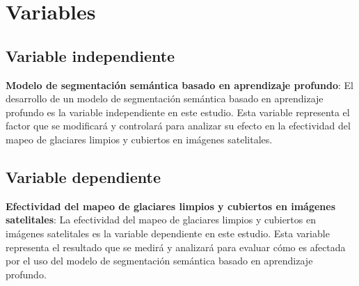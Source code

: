 \section{Variables}
\label{sec:Variables}

\subsection{Variable independiente}

\textbf{Modelo de segmentación semántica basado en aprendizaje profundo}: El desarrollo de un modelo de segmentación semántica basado en aprendizaje profundo es la variable independiente en este estudio. Esta variable representa el factor que se modificará y controlará para analizar su efecto en la efectividad del mapeo de glaciares limpios y cubiertos en imágenes satelitales.

\subsection{Variable dependiente}

\textbf{Efectividad del mapeo de glaciares limpios y cubiertos en imágenes satelitales}: La efectividad del mapeo de glaciares limpios y cubiertos en imágenes satelitales es la variable dependiente en este estudio. Esta variable representa el resultado que se medirá y analizará para evaluar cómo es afectada por el uso del modelo de segmentación semántica basado en aprendizaje profundo.  